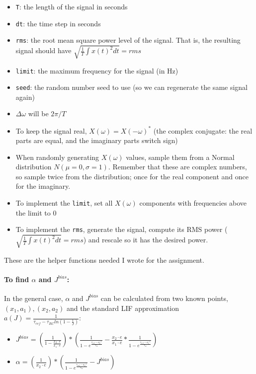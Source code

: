 \documentclass{article}
\begin{document}
\begin{itemize}
\item
  \texttt{T}: the length of the signal in seconds
\item
  \texttt{dt}: the time step in seconds
\item
  \texttt{rms}: the root mean square power level of the signal. That is,
  the resulting signal should have
  $\sqrt{\frac{1}{T} \int{x(t)^2}dt}=rms$
\item
  \texttt{limit}: the maximum frequency for the signal (in Hz)
\item
  \texttt{seed}: the random number seed to use (so we can regenerate the
  same signal again)
\item
  $\Delta \omega$ will be $2 \pi / T$
\item
  To keep the signal real, $X(\omega)=X(-\omega)^*$ (the complex
  conjugate: the real parts are equal, and the imaginary parts switch
  sign)
\item
  When randomly generating $X(\omega)$ values, sample them from a Normal
  distribution $N(\mu=0,\sigma=1)$. Remember that these are complex
  numbers, so sample twice from the distribution; once for the real
  component and once for the imaginary.
\item
  To implement the \texttt{limit}, set all $X(\omega)$ components with
  frequencies above the limit to 0
\item
  To implement the \texttt{rms}, generate the signal, compute its RMS
  power ($\sqrt{\frac{1}{T} \int{x(t)^2}dt}=rms$) and rescale so it has
  the desired power.
\end{itemize}
\hrulefill

These are the helper functions needed I wrote for the assignment.

\paragraph{To find $\alpha$ and
$J^{bias}$:}\label{to-find-alpha-and-jbias}

In the general case, $\alpha$ and $J^{bias}$ can be calculated from two
known points, $(x_1, a_1), (x_2, a_2)$ and the standard LIF
approximation $a(J)=\frac{1} {\tau_{ref}-\tau_{RC}ln(1-\frac{1}{J})}$:

\begin{itemize}
\item
  $J^{bias} = (\frac{1}{1-\frac{x_2 \cdot e}{x_1 \cdot e}}) * (\frac{1}{1-e^{\frac{\tau_{ref} - a_2^{-1}}{\tau_{rc}}}} - \frac{x_2 \cdot e}{x_1 \cdot e} * \frac{1}{1-e^{\frac{\tau_{ref} - a_1^{-1}}{\tau_{rc}}}})$
\item
  $\alpha=(\frac{1}{x_2 \cdot e})*(\frac{1}{1-e^{\frac{\tau_{ref} - a_2^{-1}}{\tau_{rc}}}} - J^{bias})$
\end{itemize}
\end{document}
